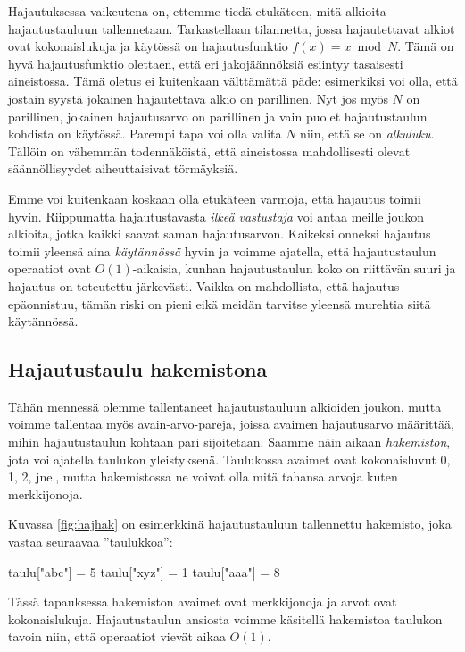 Hajautuksessa vaikeutena on, ettemme tiedä etukäteen,
mitä alkioita hajautustauluun tallennetaan.
Tarkastellaan tilannetta,
jossa hajautettavat alkiot ovat kokonaislukuja
ja käytössä on hajautusfunktio $f(x) = x \bmod N$.
Tämä on hyvä hajautusfunktio olettaen,
että eri jakojäännöksiä esiintyy tasaisesti aineistossa.
Tämä oletus ei kuitenkaan välttämättä päde:
esimerkiksi voi olla, että jostain syystä
jokainen hajautettava alkio on parillinen.
Nyt jos myös $N$ on parillinen, jokainen hajautusarvo
on parillinen ja vain puolet hajautustaulun kohdista on käytössä.
Parempi tapa voi olla valita $N$ niin, että se on \emph{alkuluku}.
Tällöin on vähemmän todennäköistä,
että aineistossa mahdollisesti olevat säännöllisyydet
aiheuttaisivat törmäyksiä.

Emme voi kuitenkaan koskaan olla etukäteen varmoja,
että hajautus toimii hyvin.
Riippumatta hajautustavasta
\emph{ilkeä vastustaja} voi antaa
meille joukon alkioita, jotka kaikki saavat saman hajautusarvon.
Kaikeksi onneksi hajautus toimii yleensä aina \emph{käytännössä}
hyvin ja voimme ajatella, että hajautustaulun operaatiot ovat
$O(1)$-aikaisia, kunhan hajautustaulun koko on riittävän suuri ja
hajautus on toteutettu järke\-västi.
Vaikka on mahdollista, että hajautus epäonnistuu,
tämän riski on pieni eikä meidän tarvitse yleensä murehtia
siitä käytännössä.

\subsection{Hajautustaulu hakemistona}


Tähän mennessä olemme tallentaneet hajautustauluun
alkioiden joukon,
mutta voimme tallentaa myös avain-arvo-pareja,
joissa avaimen hajautusarvo määrittää,
mihin hajautustaulun kohtaan pari sijoitetaan.
Saamme näin aikaan \emph{hakemiston},
jota voi ajatella taulukon yleistyksenä.
Taulukossa avaimet ovat kokonaisluvut 0, 1, 2, jne.,
mutta hakemistossa ne voivat olla mitä tahansa arvoja
kuten merkkijonoja.

Kuvassa \ref{fig:hajhak} on esimerkkinä hajautustauluun
tallennettu hakemisto, joka vastaa seuraavaa ''taulukkoa'':

\begin{code}
taulu["abc"] = 5
taulu["xyz"] = 1
taulu["aaa"] = 8
\end{code}

Tässä tapauksessa hakemiston avaimet ovat merkkijonoja
ja arvot ovat kokonaislukuja.
Hajautustaulun ansiosta voimme käsitellä hakemistoa
taulukon tavoin niin, että operaatiot vievät aikaa $O(1)$.

